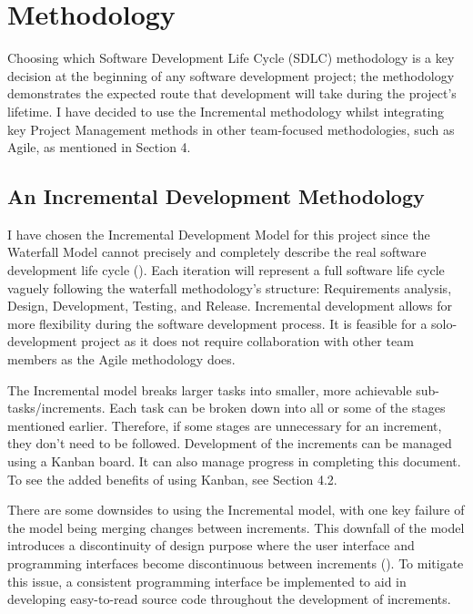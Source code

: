 \chapter{Methodology}
\label{chap:methodology}

Choosing which Software Development Life Cycle (SDLC) methodology is a key decision at the beginning of any software development project; the methodology demonstrates the expected route that development will take during the project's lifetime. I have decided to use the Incremental methodology whilst integrating key Project Management methods in other team-focused methodologies, such as Agile, as mentioned in Section 4.

\section{An Incremental Development Methodology}
\label{methodology:chosen}

I have chosen the Incremental Development Model for this project since the Waterfall Model cannot precisely and completely describe the real software development life cycle (\cite{dapeng_liu_case_2011}).
Each iteration will represent a full software life cycle vaguely following the waterfall methodology's structure: Requirements analysis, Design, Development, Testing, and Release. Incremental development allows for more flexibility during the software development process. It is feasible for a solo-development project as it does not require collaboration with other team members as the Agile methodology does.

The Incremental model breaks larger tasks into smaller, more achievable sub-tasks/increments. Each task can be broken down into all or some of the stages mentioned earlier. Therefore, if some stages are unnecessary for an increment, they don't need to be followed. Development of the increments can be managed using a Kanban board. It can also manage progress in completing this document. To see the added benefits of using Kanban, see Section 4.2.

There are some downsides to using the Incremental model, with one key failure of the model being merging changes between increments. This downfall of the model introduces a discontinuity of design purpose where the user interface and programming interfaces become discontinuous between increments (\cite{dapeng_liu_case_2011}). To mitigate this issue, a consistent programming interface be implemented to aid in developing easy-to-read source code throughout the development of increments.